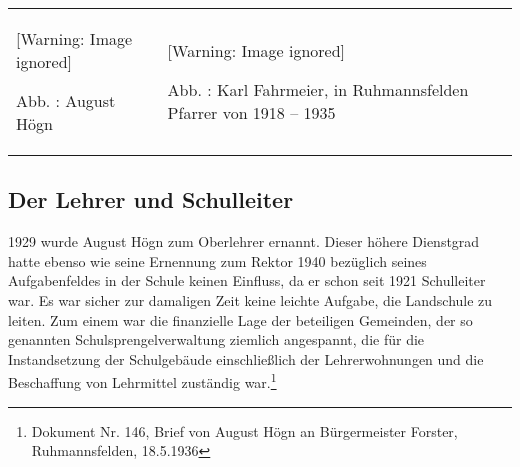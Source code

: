 \documentclass[a4paper]{article}
\newcounter{Abb}
\renewcommand\theAbb{\arabic{Abb}}
\begin{document}
\begin{center}
\begin{minipage}{9.638cm}
\begin{center}
\tablefirsthead{}
\tablehead{}
\tabletail{}
\tablelasttail{}
\begin{supertabular}{m{4.333cm}m{4.905cm}}
  [Warning: Image ignored] %
 
Abb. \stepcounter{Abb}{\theAbb}: August Högn &
  [Warning: Image ignored] %
 
Abb. \stepcounter{Abb}{\theAbb}: Karl Fahrmeier, in Ruhmannsfelden
Pfarrer von 1918 – 1935\\
\end{supertabular}
\end{center}
\end{minipage}
\end{center}
\clearpage\subsection{Der Lehrer und Schulleiter}
\hypertarget{RefHeadingToc100333733}{}1929 wurde August Högn zum
Oberlehrer ernannt. Dieser höhere Dienstgrad hatte ebenso wie seine
Ernennung zum Rektor 1940 bezüglich seines Aufgabenfeldes in der Schule
keinen Einfluss, da er schon seit 1921 Schulleiter war. Es war sicher
zur damaligen Zeit keine leichte Aufgabe, die Landschule zu leiten. Zum
einem war die finanzielle Lage der beteiligen Gemeinden, der so
genannten Schulsprengelverwaltung ziemlich angespannt, die für die
Instandsetzung der Schulgebäude einschließlich der Lehrerwohnungen und
die Beschaffung von Lehrmittel zuständig war.\footnote{ Dokument Nr.
146, Brief von August Högn an Bürgermeister Forster, Ruhmannsfelden,
18.5.1936} 
\end{document}
